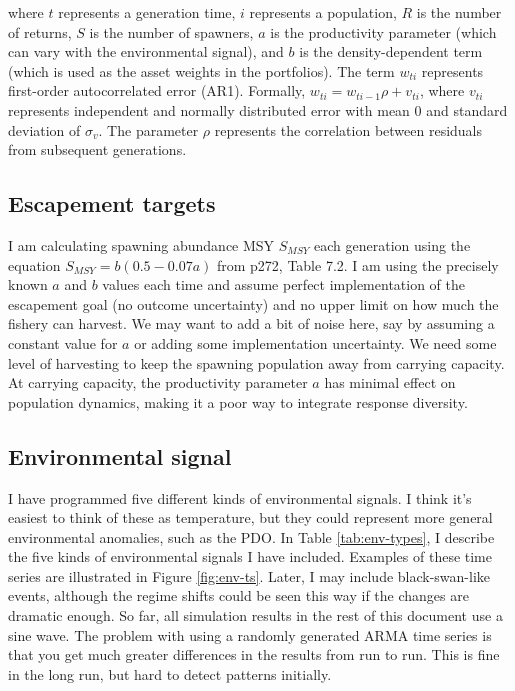 \documentclass[12pt]{article}
\begin{document}
\noindent
where $t$ represents a generation time, $i$ represents a population, $R$
is the number of returns, $S$ is the number of spawners, $a$ is the
productivity parameter (which can vary with the environmental signal),
and $b$ is the density-dependent term (which is used as the asset
weights in the portfolios). The term $w_{ti}$ represents first-order
autocorrelated error (AR1). Formally, $w_{ti} = w_{ti-1} \rho + v_{ti}$,
where $v_{ti}$ represents independent and normally distributed error
with mean 0 and standard deviation of $\sigma_v$. The parameter $\rho$
represents the correlation between residuals from subsequent
generations.

\subsection{Escapement targets}

I am calculating spawning abundance MSY $S_{MSY}$ each generation using
the equation $S_{MSY} = b(0.5-0.07a)$ from \citet{Hilborn1992} p272,
Table 7.2. I am using the precisely known $a$ and $b$ values each time
and assume perfect implementation of the escapement goal (no outcome
uncertainty) and no upper limit on how much the fishery can harvest. We
may want to add a bit of noise here, say by assuming a constant value
for $a$ or adding some implementation uncertainty. We need some level of
harvesting to keep the spawning population away from carrying capacity.
At carrying capacity, the productivity parameter $a$ has minimal effect
on population dynamics, making it a poor way to integrate response
diversity.

\subsection{Environmental signal}

I have programmed five different kinds of environmental signals. I think
it's easiest to think of these as temperature, but they could represent
more general environmental anomalies, such as the PDO. In Table
\ref{tab:env-types}, I describe the five kinds of environmental signals
I have included. Examples of these time series are illustrated in Figure
\ref{fig:env-ts}. Later, I may include black-swan-like events, although
the regime shifts could be seen this way if the changes are dramatic
enough. So far, all simulation results in the rest of this document use
a sine wave. The problem with using a randomly generated ARMA time
series is that you get much greater differences in the results from run
to run. This is fine in the long run, but hard to detect patterns
initially.
\end{document}
